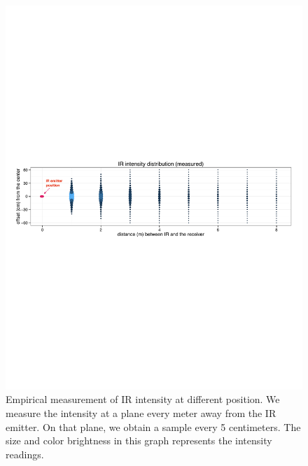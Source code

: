 \begin{figure}[t]
\centering
\includegraphics[width=1\columnwidth]{figures/IRIntensityDistribution.pdf}
\caption{Empirical measurement of IR intensity at different position. We measure the intensity at a plane every meter away from the IR emitter. On that plane, we obtain a sample every 5 centimeters. The size and color brightness in this graph represents the intensity readings.}
\label{fig:measurement}
\end{figure}

